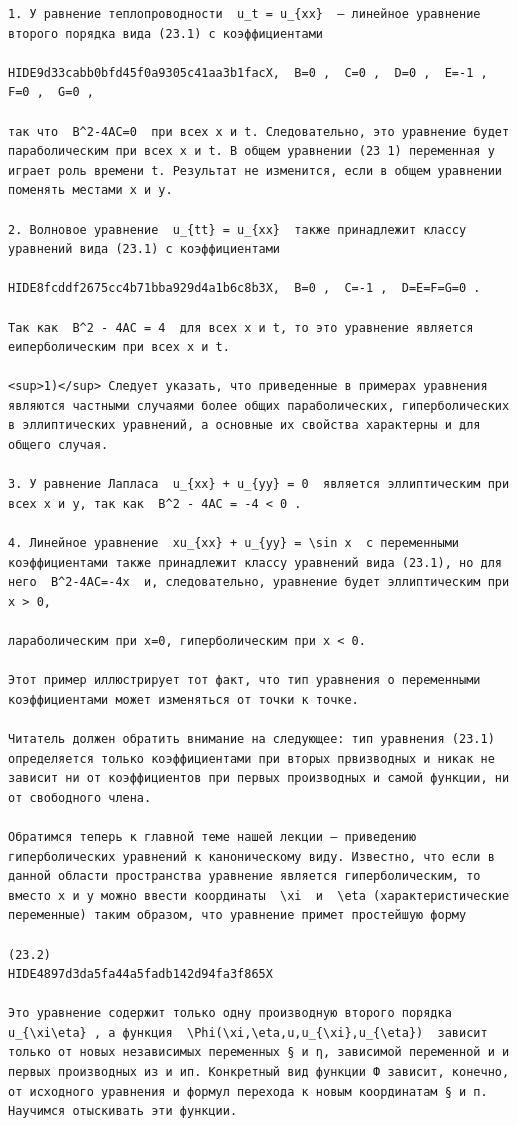 \documentclass[
  ukrainian,
]{article}
\begin{document}
\begin{verbatim}
1. У равнение теплопроводности  u_t = u_{xx}  — линейное уравнение второго порядка вида (23.1) с коэффициентами

HIDE9d33cabb0bfd45f0a9305c41aa3b1facX,  B=0 ,  C=0 ,  D=0 ,  E=-1 ,  F=0 ,  G=0 ,

так что  B^2-4AC=0  при всех x и t. Следовательно, это уравнение будет параболическим при всех x и t. В общем уравнении (23 1) переменная y играет роль времени t. Результат не изменится, если в общем уравнении поменять местами x и y.

2. Волновое уравнение  u_{tt} = u_{xx}  также принадлежит классу уравнений вида (23.1) с коэффициентами

HIDE8fcddf2675cc4b71bba929d4a1b6c8b3X,  B=0 ,  C=-1 ,  D=E=F=G=0 .

Так как  B^2 - 4AC = 4  для всех x и t, то это уравнение является еиперболическим при всех x и t.

<sup>1)</sup> Следует указать, что приведенные в примерах уравнения являются частными случаями более общих параболических, гиперболических в эллиптических уравнений, а основные их свойства характерны и для общего случая.

3. У равнение Лапласа  u_{xx} + u_{yy} = 0  является эллиптическим при всех x и y, так как  B^2 - 4AC = -4 < 0 .

4. Линейное уравнение  xu_{xx} + u_{yy} = \sin x  с переменными коэффициентами также принадлежит классу уравнений вида (23.1), но для него  B^2-4AC=-4x  и, следовательно, уравнение будет эллиптическим при x > 0,

лараболическим при x=0, гиперболическим при x < 0.

Этот пример иллюстрирует тот факт, что тип уравнения о переменными коэффициентами может изменяться от точки к точке.

Читатель должен обратить внимание на следующее: тип уравнения (23.1) определяется только коэффициентами при вторых првизводных и никак не зависит ни от коэффициентов при первых производных и самой функции, ни от свободного члена.

Обратимся теперь к главной теме нашей лекции — приведению гиперболических уравнений к каноническому виду. Известно, что если в данной области пространства уравнение является гиперболическим, то вместо x и y можно ввести координаты  \xi  и  \eta (характеристические переменные) таким образом, что уравнение примет простейшую форму

(23.2) 
HIDE4897d3da5fa44a5fadb142d94fa3f865X

Это уравнение содержит только одну производную второго порядка  u_{\xi\eta} , а функция  \Phi(\xi,\eta,u,u_{\xi},u_{\eta})  зависит только от новых независимых переменных § и η, зависимой переменной и и первых производных из и ип. Конкретный вид функции Ф зависит, конечно, от исходного уравнения и формул перехода к новым координатам § и п. Научимся отыскивать эти функции.


\end{verbatim}
\end{document}

